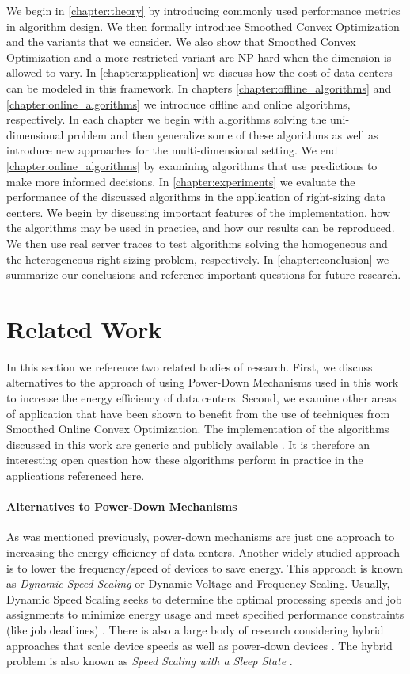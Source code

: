 We begin in \autoref{chapter:theory} by introducing commonly used performance metrics in algorithm design. We then formally introduce Smoothed Convex Optimization and the variants that we consider. We also show that Smoothed Convex Optimization and a more restricted variant are NP-hard when the dimension is allowed to vary. In \autoref{chapter:application} we discuss how the cost of data centers can be modeled in this framework. In chapters \ref{chapter:offline_algorithms} and \ref{chapter:online_algorithms} we introduce offline and online algorithms, respectively. In each chapter we begin with algorithms solving the uni-dimensional problem and then generalize some of these algorithms as well as introduce new approaches for the multi-dimensional setting. We end \autoref{chapter:online_algorithms} by examining algorithms that use predictions to make more informed decisions. In \autoref{chapter:experiments} we evaluate the performance of the discussed algorithms in the application of right-sizing data centers. We begin by discussing important features of the implementation, how the algorithms may be used in practice, and how our results can be reproduced. We then use real server traces to test algorithms solving the homogeneous and the heterogeneous right-sizing problem, respectively. In \autoref{chapter:conclusion} we summarize our conclusions and reference important questions for future research.

\section{Related Work}

In this section we reference two related bodies of research. First, we discuss alternatives to the approach of using Power-Down Mechanisms used in this work to increase the energy efficiency of data centers. Second, we examine other areas of application that have been shown to benefit from the use of techniques from Smoothed Online Convex Optimization. The implementation of the algorithms discussed in this work are generic and publicly available \cite{Hübotter2021}. It is therefore an interesting open question how these algorithms perform in practice in the applications referenced here.

\paragraph{Alternatives to Power-Down Mechanisms} As was mentioned previously, power-down mechanisms are just one approach to increasing the energy efficiency of data centers. Another widely studied approach is to lower the frequency/speed of devices to save energy. This approach is known as \textit{Dynamic Speed Scaling} or Dynamic Voltage and Frequency Scaling. Usually, Dynamic Speed Scaling seeks to determine the optimal processing speeds and job assignments to minimize energy usage and meet specified performance constraints (like job deadlines) \cite{Albers2007, Albers2011, Jin2016}. There is also a large body of research considering hybrid approaches that scale device speeds as well as power-down devices \cite{Jin2016}. The hybrid problem is also known as \textit{Speed Scaling with a Sleep State} \cite{Albers2014}.

